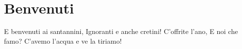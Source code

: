 \section{Benvenuti}
\subtitle{Sulla melodia di “La società dei Magnaccioni”} %
\begin{canzone}
E benvenuti ai santannini,
Ignoranti e anche cretini!
C’offrite l’ano,
E noi che famo?
C’avemo l’acqua e ve la tiriamo!
\end{canzone}
